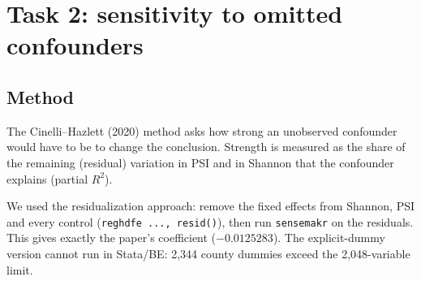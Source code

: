 \documentclass[11pt]{article}
\begin{document}
\section{Task 2: sensitivity to omitted confounders}
\subsection{Method}
The Cinelli--Hazlett (2020) method asks how strong an unobserved confounder would have to be to change the conclusion. Strength is measured as the share of the remaining (residual) variation in PSI and in Shannon that the confounder explains (partial $R^2$).

We used the residualization approach: remove the fixed effects from Shannon, PSI and every control (\texttt{reghdfe ..., resid()}), then run \texttt{sensemakr} on the residuals. This gives exactly the paper's coefficient ($-0.0125283$). The explicit-dummy version cannot run in Stata/BE: 2,344 county dummies exceed the 2,048-variable limit.
\end{document}
